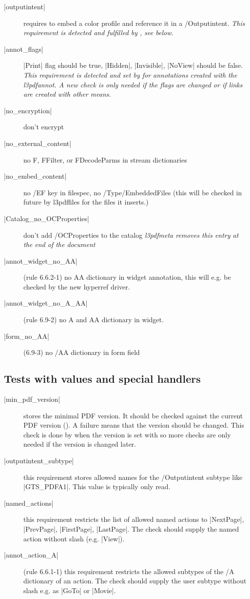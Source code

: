 \documentclass{l3doc}
\begin{document}
\begin{description}

\item[|outputintent|] requires to embed a color profile and reference it in a /Outputintent. 
 {\em This requirement is detected and fulfilled by , see below}.
 
\item[|annot_flags|] |Print| flag should be true, |Hidden|, |Invisible|, |NoView| should be false. 
 {\em This requirement is detected  and set by  for annotations created with the l3pdfannot. A new check is only needed if the flags are changed or if links are created with other means.}

\item[|no_encryption|] don't encrypt
\item[|no_external_content|] no F, FFilter, or FDecodeParms in stream dictionaries
\item[|no_embed_content|]    no /EF key in filespec, no /Type/EmbeddedFiles (this will be checked in future by l3pdffiles for the files it inserts.)
\item[|Catalog_no_OCProperties|] don't add /OCProperties to the catalog {\em l3pdfmeta removes this entry at the end of the document}
\item[|annot_widget_no_AA|] (rule 6.6.2-1)  no AA dictionary in widget annotation, this will e.g. be checked by the new hyperref driver.
\item[|annot_widget_no_A_AA|] (rule 6.9-2)  no A and AA dictionary in widget.
\item[|form_no_AA|] (6.9-3)  no /AA dictionary in form field
\end{description}

\subsection{Tests with values and special handlers}

\begin{description}

\item[|min_pdf_version|]  stores the minimal PDF version.  It should be checked against the current PDF version ().
 A failure means that the version should be changed.
 This check is done by  when the version is set with 
  so more checks are only needed if the version is changed later.
\item[|outputintent_subtype|] this requirement stores allowed names for the /Outputintent subtype  like |GTS_PDFA1|. 
This value is typically only read. 
\item[|named_actions|]    this requirement restricts the list of allowed named actions to |NextPage|, |PrevPage|, |FirstPage|, |LastPage|.
The check should supply the named action without slash (e.g. |View|). 

\item[|annot_action_A|] (rule 6.6.1-1) this requirement restricts the allowed subtypes of the
/A dictionary of an action. The check should supply the user subtype without slash e.g. as |GoTo| or |Movie|. 
\end{description}
\end{document}
